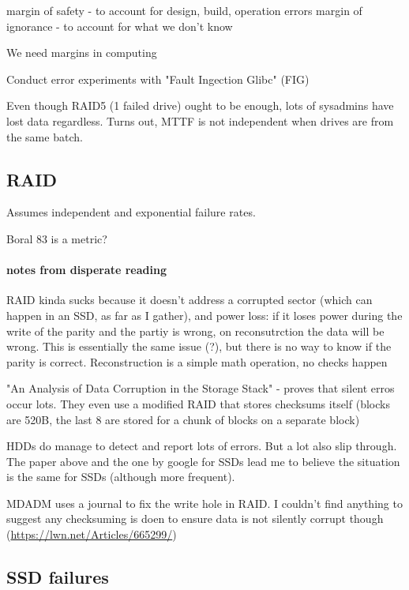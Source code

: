 \documentclass[a4paper]{report}
\begin{document}
        margin of safety - to account for design, build, operation errors
        margin of ignorance - to account for what we don't know

        We need margins in computing

        Conduct error experiments with "Fault Ingection Glibc" (FIG)

        Even though RAID5 (1 failed drive) ought to be enough, lots of
        sysadmins have lost data regardless. Turns out, MTTF is not independent
        when drives are from the same batch.

    \subsection{RAID}
        Assumes independent and exponential failure rates.

        Boral 83 is a metric?

        \paragraph{notes from disperate reading}

        RAID kinda sucks because it doesn't address a corrupted sector (which
        can happen in an SSD, as far as I gather), and power loss: if it loses
        power during the write of the parity and the partiy is wrong, on
        reconsutrction the data will be wrong. This is essentially the same
        issue (?), but there is no way to know if the parity is correct.
        Reconstruction is a simple math operation, no checks happen

        "An Analysis of Data Corruption in the Storage Stack" - proves that
        silent erros occur lots. They even use a modified RAID that stores
        checksums itself (blocks are 520B, the last 8 are stored for a chunk of
        blocks on a separate block)

        HDDs do manage to detect and report lots of errors. But a lot also slip
        through. The paper above and the one by google for SSDs lead me to
        believe the situation is the same for SSDs (although more frequent).

        MDADM uses a journal to fix the write hole in RAID. I couldn't find
        anything to suggest any checksuming is doen to ensure data is not
        silently corrupt though (\url{https://lwn.net/Articles/665299/})


    \subsection{SSD failures}
\end{document}

